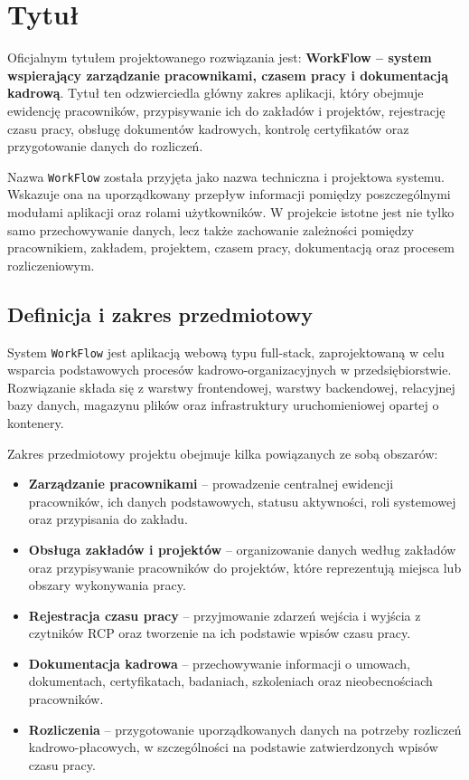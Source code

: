 \section{Tytuł}

Oficjalnym tytułem projektowanego rozwiązania jest: \textbf{WorkFlow -- system wspierający zarządzanie pracownikami, czasem pracy i dokumentacją kadrową}. Tytuł ten odzwierciedla główny zakres aplikacji, który obejmuje ewidencję pracowników, przypisywanie ich do zakładów i projektów, rejestrację czasu pracy, obsługę dokumentów kadrowych, kontrolę certyfikatów oraz przygotowanie danych do rozliczeń.

Nazwa \texttt{WorkFlow} została przyjęta jako nazwa techniczna i projektowa systemu. Wskazuje ona na uporządkowany przepływ informacji pomiędzy poszczególnymi modułami aplikacji oraz rolami użytkowników. W projekcie istotne jest nie tylko samo przechowywanie danych, lecz także zachowanie zależności pomiędzy pracownikiem, zakładem, projektem, czasem pracy, dokumentacją oraz procesem rozliczeniowym.

\subsection{Definicja i zakres przedmiotowy}

System \texttt{WorkFlow} jest aplikacją webową typu full-stack, zaprojektowaną w celu wsparcia podstawowych procesów kadrowo-organizacyjnych w przedsiębiorstwie. Rozwiązanie składa się z warstwy frontendowej, warstwy backendowej, relacyjnej bazy danych, magazynu plików oraz infrastruktury uruchomieniowej opartej o kontenery.

Zakres przedmiotowy projektu obejmuje kilka powiązanych ze sobą obszarów:
\begin{itemize}
    \item \textbf{Zarządzanie pracownikami} -- prowadzenie centralnej ewidencji pracowników, ich danych podstawowych, statusu aktywności, roli systemowej oraz przypisania do zakładu.
    \item \textbf{Obsługa zakładów i projektów} -- organizowanie danych według zakładów oraz przypisywanie pracowników do projektów, które reprezentują miejsca lub obszary wykonywania pracy.
    \item \textbf{Rejestracja czasu pracy} -- przyjmowanie zdarzeń wejścia i wyjścia z czytników RCP oraz tworzenie na ich podstawie wpisów czasu pracy.
    \item \textbf{Dokumentacja kadrowa} -- przechowywanie informacji o umowach, dokumentach, certyfikatach, badaniach, szkoleniach oraz nieobecnościach pracowników.
    \item \textbf{Rozliczenia} -- przygotowanie uporządkowanych danych na potrzeby rozliczeń kadrowo-płacowych, w szczególności na podstawie zatwierdzonych wpisów czasu pracy.
\end{itemize}

